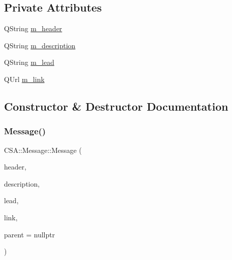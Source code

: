 \subsection*{Private Attributes}
\begin{DoxyCompactItemize}
\item 
Q\+String \mbox{\hyperlink{classCSA_1_1Message_a3c274902f4b87b5acd6e15e60d8909eb}{m\+\_\+header}}
\item 
Q\+String \mbox{\hyperlink{classCSA_1_1Message_ae91f8d05186178670a26d8acf9279b14}{m\+\_\+description}}
\item 
Q\+String \mbox{\hyperlink{classCSA_1_1Message_a89d011c48a82f63384531d1af495ab79}{m\+\_\+lead}}
\item 
Q\+Url \mbox{\hyperlink{classCSA_1_1Message_a8d8f7f50df05a4f0ae80e9cd40c4435b}{m\+\_\+link}}
\end{DoxyCompactItemize}


\subsection{Constructor \& Destructor Documentation}
\mbox{\label{classCSA_1_1Message_aca2e81acce38bd7ac3e2b44669c41e9e}} 
\subsubsection{\texorpdfstring{Message()}{Message()}\hspace{0.1cm}{\footnotesize\ttfamily [1/2]}}
{\footnotesize\ttfamily C\+S\+A\+::\+Message\+::\+Message (\begin{DoxyParamCaption}\item[{const Q\+String \&}]{header,  }\item[{const Q\+String \&}]{description,  }\item[{const Q\+String \&}]{lead,  }\item[{const Q\+Url \&}]{link,  }\item[{Q\+Object $\ast$}]{parent = {\ttfamily nullptr} }\end{DoxyParamCaption})\hspace{0.3cm}{\ttfamily [explicit]}}

\mbox{\label{classCSA_1_1Message_ae1abb7c31a0f40f3601b7d2b21d2fec9}} 

